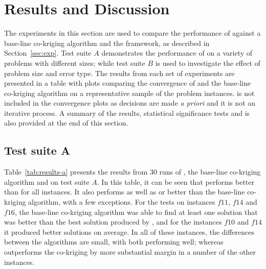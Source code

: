 \section{Results and Discussion}\label{sec:results}

The experiments in this section are used to compare the performance of \AlgName{} against a base-line co-kriging algorithm and the \motos{} framework, as described in Section~\ref{sec:exp}. Test suite $A$ demonstrates the performance of \AlgName{} on a variety of problems with different sizes; while test suite $B$ is used to investigate the effect of problem size and error type. The results from each set of experiments are presented in a table with plots comparing the convergence of \AlgName{} and the base-line co-kriging algorithm on a representative sample of the problem instances. \motos{} is not included in the convergence plots as decisions are made \emph{a priori} and it is not an iterative process. A summary of the results, statistical significance tests and is also provided at the end of this section.

\subsection*{Test suite A}

Table~\ref{tab:results-a} presents the results from 30 runs of \AlgName{}, the base-line co-kriging algorithm and \motos{} on test suite $A$. In this table, it can be seen that \AlgName{} performs better than \motos{} for all instances. It also performs as well as or better than the base-line co-kriging algorithm, with a few exceptions. For the tests on instances $f11$, $f14$ and $f16$, the base-line co-kriging algorithm was able to find at least one solution that was better than the best solution produced by \AlgName{}, and for the instances $f10$ and $f14$ it produced better solutions on average. In all of these instances, the differences between the algorithms are small, with both performing well; whereas \AlgName{} outperforms the co-kriging by more substantial margin in a number of the other instances.

